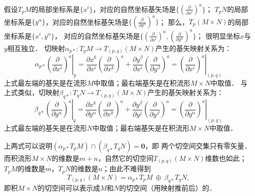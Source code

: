 假设$T_p M$的局部坐标系是$\{x^i\}$，对应的自然坐标基矢场是$\{(\frac{\partial }{\partial x^i})^a\}$；
$T_p N$的局部坐标系是$\{y^\alpha\}$，对应的自然坐标基矢场是$\{(\frac{\partial }{\partial y^\alpha})^a\}$；
那么，$T_p (M\times N)$的局部坐标系是$\{x^i,y^\alpha\}$，
对应的自然坐标基矢场是$\{(\frac{\partial }{\partial x^i})^a,(\frac{\partial }{\partial y^\alpha})^a\}$；
很明显坐标$x$与$y$相互独立．
切映射$\alpha_{p*} : T_p M \to T_{(p,q)}(M\times N)$产生的基矢映射关系为：
\begin{equation}
    \alpha_{p*} \left. \left(\frac{\partial }{\partial x^i}\right)^a \right|_{p}=
    \frac{\partial x^k}{\partial x^i}\left(\frac{\partial }{\partial x^k}\right)^a
    +\frac{\partial y^\beta}{\partial x^i}\left(\frac{\partial }{\partial y^\beta}\right)^a
    =\left. \left(\frac{\partial }{\partial x^i}\right)^a \right|_{{(p,q)}}
\end{equation}
上式最左端的基矢是在流形$M$中取值；最右端基矢是在积流形$M\times N$中取值．
与上式类似，切映射$\beta_{q*} : T_q N \to T_{(p,q)}(M\times N)$产生的基矢映射关系为：
\begin{equation}
    \beta_{q*} \left. \left(\frac{\partial }{\partial y^\alpha}\right)^a \right|_{q}=
    \frac{\partial x^k}{\partial y^\alpha}\left(\frac{\partial }{\partial x^k}\right)^a
    +\frac{\partial y^\beta}{\partial y^j}\left(\frac{\partial }{\partial y^\beta}\right)^a
    =\left. \left(\frac{\partial }{\partial y^\alpha}\right)^a \right|_{{(p,q)}}
\end{equation}
上式最左端的基矢是在流形$N$中取值；最右端基矢是在积流形$M\times N$中取值．

上两式可以说明$(\alpha_{p*} T_p M) \cap (\beta_{q*}  T_q N) =\boldsymbol{0}$，即
两个切空间交集只有零矢量．而积流形$M\times N$的维数是$m+n$，自然它的切空间$T_{(p,q)} (M\times N)$维数也如此；
$T_p M$的维数是$m$，$T_p N$的维数是$n$；由此不难得到
\begin{equation}
    T_{(p,q)} (M\times N) = \alpha_{p*} T_p M \ \oplus\ \beta_{q*}  T_q N ,
\end{equation}
即积$M\times N$的切空间可以表示成$M$和$N$的切空间（用映射推前后）的．


